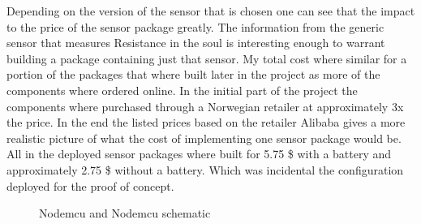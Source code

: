 \documentclass[]{uiophd}
\begin{document}
Depending on the version of the sensor that is chosen one can see that the impact to the price of the sensor package greatly. The information from the generic sensor that measures Resistance in the soul is interesting enough to warrant building a package containing just that sensor. My total cost where similar for a portion of the packages that where built later in the project as  more of the components where ordered online. In the initial part of the project the components where purchased through a Norwegian retailer at approximately 3x the price. In the end the listed prices based on the retailer Alibaba gives a more realistic picture of what the cost of implementing one sensor package would be. All in the deployed sensor packages where built for 5.75 \$ with a battery and approximately 2.75 \$ without a battery. Which was incidental the configuration deployed for the proof of concept.


\begin{figure}[h]
\caption{Nodemcu and Nodemcu schematic}%
\centering
    \qquad
    
    \label{fig:example}%
\end{figure}
\end{document}
